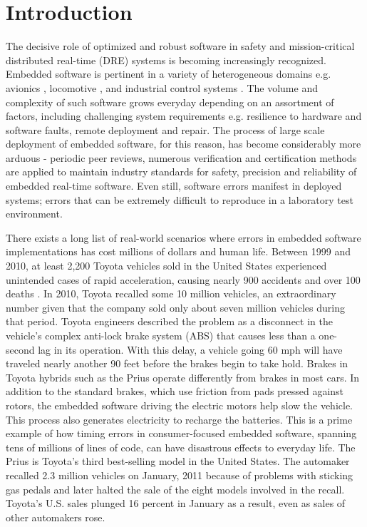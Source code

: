 \chapter{Introduction}
\label{chapter:introduction}

The decisive role of optimized and robust software in safety and mission-critical distributed real-time (DRE) systems is becoming increasingly recognized. Embedded software is pertinent in a variety of heterogeneous domains e.g. avionics \cite{burke2010distributed}, locomotive \cite{zimmermann2003train}, and industrial control systems \cite{zoitl2008real}. The volume and complexity of such software grows everyday depending on an assortment of factors, including challenging system requirements e.g. resilience to hardware and software faults, remote deployment and repair. The process of large scale deployment of embedded software, for this reason, has become considerably more arduous - periodic peer reviews, numerous verification and certification methods are applied to maintain industry standards for safety, precision and reliability of embedded real-time software. Even still, software errors manifest in deployed systems; errors that can be extremely difficult to reproduce in a laboratory test environment. 

There exists a long list of real-world scenarios where errors in embedded software implementations has cost millions of dollars and human life. Between 1999 and 2010, at least 2,200 Toyota vehicles sold in the United States experienced unintended cases of rapid acceleration, causing nearly 900 accidents and over 100 deaths \cite{Cusumano:2011:RTD:1866739.1866750}. In 2010, Toyota recalled some 10 million vehicles, an extraordinary number given that the company sold only about seven million vehicles during that period. Toyota engineers described the problem as a disconnect in the vehicle's complex anti-lock brake system (ABS) that causes less than a one-second lag in its operation. With this delay, a vehicle going 60 mph will have traveled nearly another 90 feet before the brakes begin to take hold. Brakes in Toyota hybrids such as the Prius operate differently from brakes in most cars. In addition to the standard brakes, which use friction from pads pressed against rotors, the embedded software driving the electric motors help slow the vehicle. This process also generates electricity to recharge the batteries. This is a prime example of how timing errors in consumer-focused embedded software, spanning tens of millions of lines of code, can have disastrous effects to everyday life. The Prius is Toyota's third best-selling model in the United States. The automaker recalled 2.3 million vehicles on January, 2011 because of problems with sticking gas pedals and later halted the sale of the eight models involved in the recall. Toyota's U.S. sales plunged 16 percent in January as a result, even as sales of other automakers rose.

